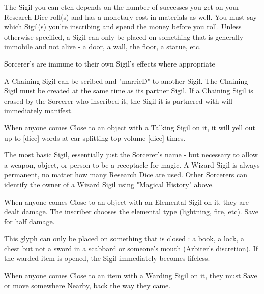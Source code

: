 {The Sigil you can etch depends on the number of successes you get on your Research Dice roll(s) and has a monetary cost in materials as well.  You must say which Sigil(s) you're inscribing and spend the money before you roll.  Unless otherwise specified, a Sigil can only be placed on something that is generally immobile and not alive - a door, a wall, the floor, a statue, etc.  

Sorcerer's are immune to their own Sigil's effects where appropriate



\mybold{\COST 50\FE}

  A Chaining Sigil can be scribed and "marrieD" to another Sigil.  The Chaining Sigil must be created at the same time as its partner Sigil.  If a Chaining Sigil is erased by the Sorcerer who inscribed it, the Sigil it is partnered with will immediately manifest.

 When anyone comes Close to an object with a Talking Sigil on it, it will yell out up to [dice] words at ear-splitting top volume [dice] times.



The most basic Sigil, essentially just the Sorcerer's name - but necessary to allow a weapon, object, or person to be a receptacle for magic.  A Wizard Sigil is always permanent, no matter how many Research Dice are used.  Other Sorcerers can identify the owner of a Wizard Sigil using "Magical History" above.


\mybold{\COST 50\AG}



When anyone comes Close to an object with an Elemental Sigil on it, they are dealt \SUMDICE damage.  The inscriber chooses the elemental type (lightning, fire, etc).  Save for half damage.


This glyph can only be placed on something that is closed : a book, a lock, a chest but not a sword in a scabbard or someone's mouth (Arbiter's discretion).  If the warded item is opened, the Sigil immediately becomes lifeless.

When anyone comes Close to an item with a Warding Sigil on it, they must Save or move somewhere Nearby, back the way they came. 



}
